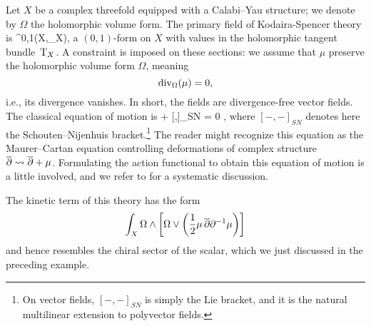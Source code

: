 \documentclass[11pt]{amsart}
\begin{document}
Let $X$ be a complex threefold equipped with a Calabi--Yau structure; we denote by $\Omega$ the holomorphic volume form.
The primary field of Kodaira-Spencer theory is 
\beqn
\mu \in \Omega^{0,1}(X,\T_X),
\eeqn 
a $(0,1)$-form  on $X$ with values in the holomorphic tangent bundle~${\rm T}_X$.
A constraint is imposed on these sections:
we assume that $\mu$ preserve the holomorphic volume form $\Omega$, meaning 
\[
{\rm div}_\Omega(\mu) = 0,
\]
i.e., its divergence vanishes.
In short, the fields are divergence-free vector fields.
The classical equation of motion is 
\beqn
\dbar \mu +  [\mu,\mu]_{SN} = 0 ,
\eeqn
where $[-,-]_{SN}$ denotes here the Schouten--Nijenhuis bracket.\footnote{On vector fields, $[-,-]_{SN}$ is simply the Lie bracket, and it is the natural multilinear extension to polyvector fields.}
The reader might recognize this equation as the Maurer--Cartan equation controlling deformations of complex structure ${\overline{\partial}}\rightsquigarrow {\overline{\partial}} + \mu$.
Formulating the action functional to obtain this equation of motion is a little involved, 
and we refer to \cite{CLbcov} for a systematic discussion.

\begin{rmk}
The kinetic term of this theory has the form
\[
\int_X \Omega \wedge \left[\Omega \vee \left(\frac12 \mu\, {\overline{\partial}} \partial^{-1} \mu\right) \right]
\]
and hence resembles the chiral sector of the scalar, which we just discussed in the preceding example.
\end{rmk}

\printbibliography
\end{document}
